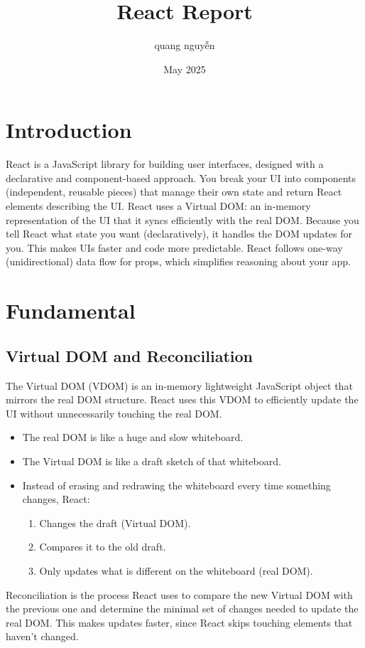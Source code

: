 \documentclass[13pt]{article}
\title{React Report}
\author{quang nguyễn}
\date{May 2025}
\begin{document}
\maketitle

\section{Introduction}
React is a JavaScript library for building user interfaces, designed with a declarative and component-based approach. You break your UI into components (independent, reusable pieces) that manage their own state and return React elements describing the UI. React uses a Virtual DOM: an in-memory representation of the UI that it syncs efficiently with the real DOM. Because you tell React what state you want (declaratively), it handles the DOM updates for you. This makes UIs faster and code more predictable. React follows one-way (unidirectional) data flow for props, which simplifies reasoning about your app.

\section{Fundamental}
\subsection{Virtual DOM and Reconciliation}
The Virtual DOM (VDOM) is an in-memory lightweight JavaScript object that mirrors the real DOM structure.
React uses this VDOM to efficiently update the UI without unnecessarily touching the real DOM.

\begin{itemize}
  \item The real DOM is like a huge and slow whiteboard.
  \item The Virtual DOM is like a draft sketch of that whiteboard.
  \item Instead of erasing and redrawing the whiteboard every time something changes, React: 
    \begin{enumerate}
        \item Changes the draft (Virtual DOM).
        \item Compares it to the old draft.
        \item Only updates what is different on the whiteboard (real DOM).
    \end{enumerate}
\end{itemize}

Reconciliation is the process React uses to compare the new Virtual DOM with the previous one and determine the minimal set of changes needed to update the real DOM.
This makes updates faster, since React skips touching elements that haven't changed.
\end{document}
